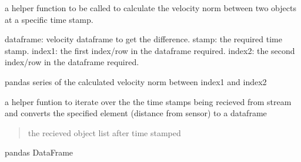 \documentclass[letterpaper,10pt,english]{sphinxmanual}
\begin{document}

\begin{fulllineitems}
\label{\detokenize{processing:processing.utils.calc_vel_mag_diff}}
\pysigstartsignatures
{}
\pysigstopsignatures\begin{description}
\sphinxAtStartPar
a helper function to be called to calculate the velocity norm between two objects at a specific time stamp.

\sphinxAtStartPar
dataframe: velocity dataframe to get the difference.
stamp:     the required time stamp.
index1:    the first index/row in the dataframe required.
index2:    the second index/row in the dataframe required.

\sphinxAtStartPar
pandas series of the calculated velocity norm between index1 and index2

\end{description}

\end{fulllineitems}


\begin{fulllineitems}
\label{\detokenize{processing:processing.utils.get_dis_from_sensor}}
\pysigstartsignatures
{}
\pysigstopsignatures\begin{description}
\sphinxAtStartPar
a helper funtion to iterate over the the time stamps being recieved from stream
and converts the specified element (distance from sensor) to a dataframe

\begin{quote}\begin{description}
\sphinxAtStartPar
the recieved object list after time stamped

\end{description}\end{quote}

\sphinxAtStartPar
pandas DataFrame

\end{description}

\end{fulllineitems}
\end{document}
